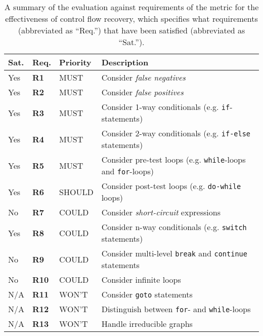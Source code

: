\begin{table}[htbp]
	\begin{center}
		\begin{tabular}{|l|l|l|l|}
			\hline
			Sat. & Req. & Priority & Description \\
			\hline
			\rowcolor{light_green_3}
			Yes & \textbf{R1} & MUST & Consider \textit{false negatives} \\
			\rowcolor{light_green_3}
			Yes & \textbf{R2} & MUST & Consider \textit{false positives} \\
			\rowcolor{light_green_3}
			Yes & \textbf{R3} & MUST & Consider 1-way conditionals (e.g. \texttt{if}-statements) \\
			\rowcolor{light_green_3}
			Yes & \textbf{R4} & MUST & Consider 2-way conditionals (e.g. \texttt{if-else} statements) \\
			\rowcolor{light_green_3}
			Yes & \textbf{R5} & MUST & Consider pre-test loops (e.g. \texttt{while}-loops and \texttt{for}-loops) \\
			\hline
			\rowcolor{light_green_3}
			Yes & \textbf{R6} & SHOULD & Consider post-test loops (e.g. \texttt{do-while} loops) \\
			\hline
			\rowcolor{light_red_3}
			No & \textbf{R7} & COULD & Consider \textit{short-circuit} expressions \\
			\rowcolor{light_green_3}
			Yes & \textbf{R8} & COULD & Consider n-way conditionals (e.g. \texttt{switch} statements) \\
			\rowcolor{light_red_3}
			No & \textbf{R9} & COULD & Consider multi-level \texttt{break} and \texttt{continue} statements \\
			\rowcolor{light_red_3}
			No & \textbf{R10} & COULD & Consider infinite loops \\
			\hline
			N/A & \textbf{R11} & WON'T & Consider \texttt{goto} statements \\
			N/A & \textbf{R12} & WON'T & Distinguish between \texttt{for}- and \texttt{while}-loops \\
			N/A & \textbf{R13} & WON'T & Handle irreducible graphs \\
			\hline
		\end{tabular}
	\end{center}
	\caption{A summary of the evaluation against requirements of the metric for the effectiveness of control flow recovery, which specifies what requirements (abbreviated as ``Req.'') that have been satisfied (abbreviated as ``Sat.'').}
	\label{tbl:eval_summary_of_metric}
\end{table}
